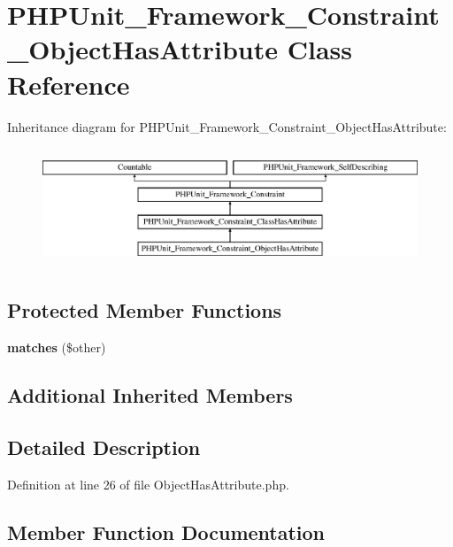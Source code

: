 \section{P\+H\+P\+Unit\+\_\+\+Framework\+\_\+\+Constraint\+\_\+\+Object\+Has\+Attribute Class Reference}
\label{class_p_h_p_unit___framework___constraint___object_has_attribute}
Inheritance diagram for P\+H\+P\+Unit\+\_\+\+Framework\+\_\+\+Constraint\+\_\+\+Object\+Has\+Attribute\+:\begin{figure}[H]
\begin{center}
\leavevmode
\includegraphics[height=3.578275cm]{class_p_h_p_unit___framework___constraint___object_has_attribute}
\end{center}
\end{figure}
\subsection*{Protected Member Functions}
\begin{DoxyCompactItemize}
\item 
{\bf matches} (\$other)
\end{DoxyCompactItemize}
\subsection*{Additional Inherited Members}


\subsection{Detailed Description}


Definition at line 26 of file Object\+Has\+Attribute.\+php.



\subsection{Member Function Documentation}
